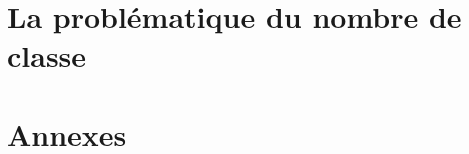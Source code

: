 \documentclass[12pt,fleqn]{report} %
\begin{document}

\part{La problématique du nombre de classe}



\appendix
\part{Annexes}



%
\nocite{*}




\end{document}
